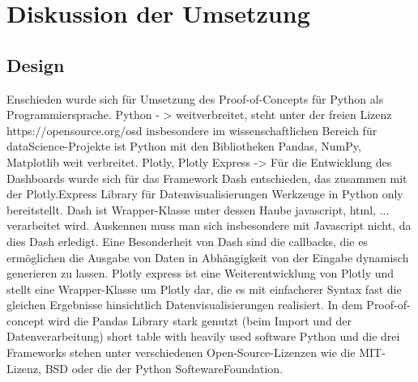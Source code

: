 \chapter{Diskussion der Umsetzung}
\label{chap:five}
\section{Design}

Enschieden wurde sich für Umsetzung  des Proof-of-Concepts für Python als Programmiersprache.
Python - > weitverbreitet, steht unter der freien Lizenz https://opensource.org/osd
insbesondere im wissenschaftlichen Bereich für dataScience-Projekte ist Python mit den Bibliotheken Pandas, NumPy, Matplotlib
weit verbreitet. 
Plotly, Plotly Express ->
Für die Entwicklung des Dashboards wurde sich für das Framework Dash entschieden, das zusammen mit der Plotly.Express Library für Datenvisualisierungen  Werkzeuge in Python only bereitstellt.  Dash ist Wrapper-Klasse unter dessen Haube javascript, html, ... verarbeitet wird. Auskennen muss man sich insbesondere mit Javascript nicht, da dies Dash erledigt.
Eine Besonderheit von Dash sind die callbacks, die es ermöglichen die Ausgabe von Daten in Abhängigkeit von der Eingabe dynamisch generieren zu lassen.
Plotly express ist eine Weiterentwicklung von Plotly und stellt eine Wrapper-Klasse um Plotly dar, die es mit einfacherer Syntax fast die gleichen Ergebnisse hinsichtlich Datenvisualisierungen realisiert.
In dem Proof-of-concept wird die Pandas Library stark genutzt (beim Import und der Datenverarbeitung)
short table with heavily used software
Python und die drei Frameworks stehen unter verschiedenen Open-Source-Lizenzen wie die MIT-Lizenz, BSD oder die der Python SoftewareFoundation.

